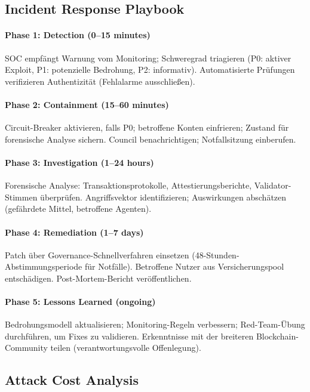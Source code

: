 \documentclass[11pt]{article}
\begin{document}
\subsection{Incident Response Playbook}

\paragraph{Phase 1: Detection (0--15 minutes)}
SOC empfängt Warnung vom Monitoring; Schweregrad triagieren (P0: aktiver Exploit, P1: potenzielle Bedrohung, P2: informativ). Automatisierte Prüfungen verifizieren Authentizität (Fehlalarme ausschließen).

\paragraph{Phase 2: Containment (15--60 minutes)}
Circuit-Breaker aktivieren, falls P0; betroffene Konten einfrieren; Zustand für forensische Analyse sichern. Council benachrichtigen; Notfallsitzung einberufen.

\paragraph{Phase 3: Investigation (1--24 hours)}
Forensische Analyse: Transaktionsprotokolle, Attestierungsberichte, Validator-Stimmen überprüfen. Angriffsvektor identifizieren; Auswirkungen abschätzen (gefährdete Mittel, betroffene Agenten).

\paragraph{Phase 4: Remediation (1--7 days)}
Patch über Governance-Schnellverfahren einsetzen (48-Stunden-Abstimmungsperiode für Notfälle). Betroffene Nutzer aus Versicherungspool entschädigen. Post-Mortem-Bericht veröffentlichen.

\paragraph{Phase 5: Lessons Learned (ongoing)}
Bedrohungsmodell aktualisieren; Monitoring-Regeln verbessern; Red-Team-Übung durchführen, um Fixes zu validieren. Erkenntnisse mit der breiteren Blockchain-Community teilen (verantwortungsvolle Offenlegung).

\subsection{Attack Cost Analysis}
\end{document}
